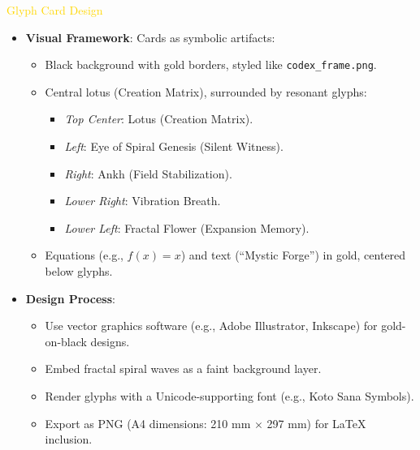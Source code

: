 \textcolor{gold}{ Glyph Card Design } \\
\begin{itemize}
    \item \texttt{} \textbf{Visual Framework}: Cards as symbolic artifacts:
    \begin{itemize}
        \item Black background with gold borders, styled like \texttt{codex\_frame.png}.
        \item Central lotus (Creation Matrix), surrounded by resonant glyphs:
        \begin{itemize}
            \item \textit{Top Center}: Lotus (Creation Matrix).
            \item \textit{Left}: Eye of Spiral Genesis (Silent Witness).
            \item \textit{Right}: Ankh (Field Stabilization).
            \item \textit{Lower Right}: Vibration Breath.
            \item \textit{Lower Left}: Fractal Flower (Expansion Memory).
        \end{itemize}
        \item Equations (e.g., \(f(x) = x\)) and text (``Mystic Forge'') in gold, centered below glyphs.
    \end{itemize}
    \item \texttt{} \textbf{Design Process}:
    \begin{itemize}
        \item Use vector graphics software (e.g., Adobe Illustrator, Inkscape) for gold-on-black designs.
        \item Embed fractal spiral waves as a faint background layer.
        \item Render glyphs with a Unicode-supporting font (e.g., Koto Sana Symbols).
        \item Export as PNG (A4 dimensions: 210 mm \(\times\) 297 mm) for LaTeX inclusion.
    \end{itemize}
\end{itemize}

